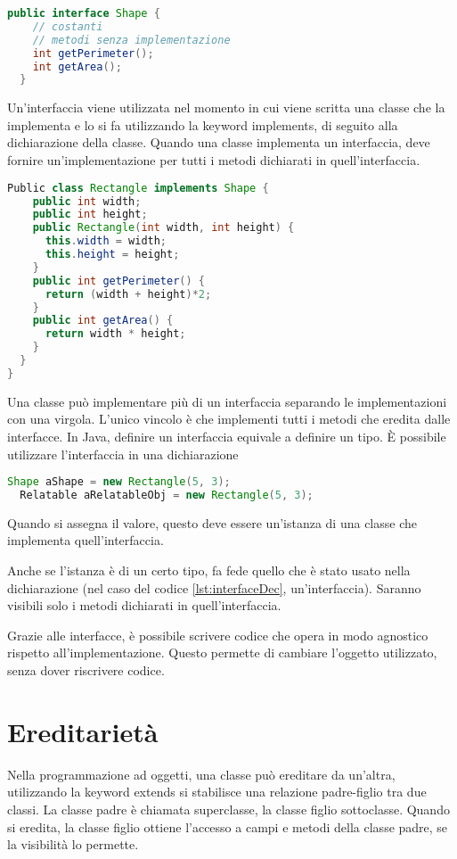 \documentclass[a4paper,12pt,twoside]{book}
\begin{document}
\begin{lstlisting}[caption={Interfaccia},
  label={lst:Interface},language=Java]
  public interface Shape {
    // costanti
    // metodi senza implementazione
    int getPerimeter();
    int getArea();
  }
\end{lstlisting}

Un’interfaccia viene utilizzata nel momento in cui viene scritta una
classe che la implementa e lo si fa utilizzando la keyword implements, di
seguito alla dichiarazione della classe. Quando una classe implementa
un interfaccia, deve fornire un’implementazione per tutti i metodi
dichiarati in quell’interfaccia.

\begin{lstlisting}[caption={Implementazione interfaccia},
  label={lst:Implements},language=Java]
  Public class Rectangle implements Shape {
    public int width;
    public int height;
    public Rectangle(int width, int height) {
      this.width = width;
      this.height = height;
    }
    public int getPerimeter() {
      return (width + height)*2;
    }
    public int getArea() {
      return width * height;
    }
  }
}
\end{lstlisting}

Una classe può implementare più di un interfaccia separando le
implementazioni con una virgola. L’unico vincolo è che implementi
tutti i metodi che eredita dalle interfacce.
In Java, definire un interfaccia equivale a definire un
tipo. È possibile utilizzare l’interfaccia in una dichiarazione

\begin{lstlisting}[caption={Dichiarazione interfaccia},
  label={lst:interfaceDec},language=Java]
  Shape aShape = new Rectangle(5, 3);
  Relatable aRelatableObj = new Rectangle(5, 3);
\end{lstlisting}
Quando si assegna il valore, questo deve essere un’istanza di una
classe che implementa quell’interfaccia.

Anche se l'istanza è di un certo tipo, fa fede quello che è stato
usato nella dichiarazione (nel caso del codice \ref{lst:interfaceDec},
un'interfaccia). Saranno visibili solo i metodi dichiarati in
quell'interfaccia.

Grazie alle interfacce, è possibile scrivere codice che opera in modo
agnostico rispetto all’implementazione. Questo permette di cambiare
l’oggetto utilizzato, senza dover riscrivere codice.

\section{Ereditarietà}
Nella programmazione ad oggetti, una classe può ereditare da un’altra,
utilizzando la keyword extends si stabilisce una relazione
padre-figlio tra due classi. La classe padre è chiamata superclasse,
la classe figlio sottoclasse. Quando si eredita, la classe figlio
ottiene l’accesso a campi e metodi della classe padre, se la
visibilità lo permette. %
\end{document}
